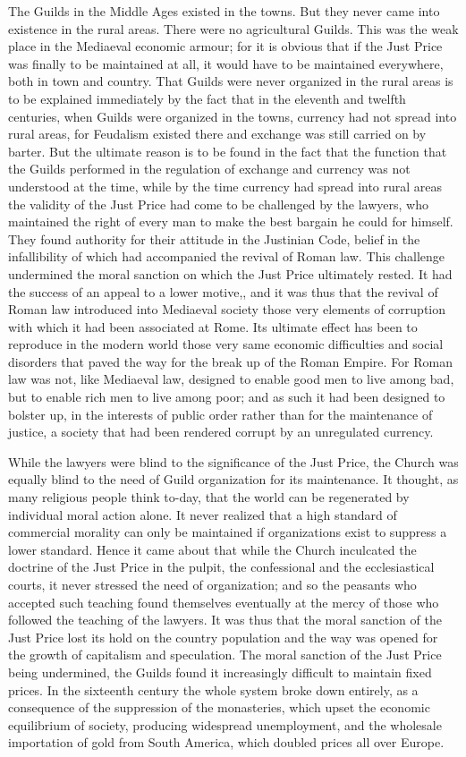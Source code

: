 \documentclass{book}
\begin{document}
The Guilds in the Middle Ages existed in the towns. But they never came into existence in the rural areas. There were no agricultural Guilds. This was the weak place in the Mediaeval economic armour; for it is obvious that if the Just Price was finally to be maintained at all, it would have to be maintained everywhere, both in town and country. That Guilds were never organized in the rural areas is to be explained immediately by the fact that in the eleventh and twelfth centuries, when Guilds were organized in the towns, currency had not spread into rural areas, for Feudalism existed there and exchange was still carried on by barter. But the ultimate reason is to be found in the fact that the function that the Guilds performed in the regulation of exchange and currency was not understood at the time, while by the time currency had spread into rural areas the validity of the Just Price had come to be challenged by the lawyers, who maintained the right of every man to make the best bargain he could for himself. They found authority for their attitude in the Justinian Code, belief in the infallibility of which had accompanied the revival of Roman law. This challenge undermined the moral sanction on which the Just Price ultimately rested. It had the success of an appeal to a lower motive,, and it was thus that the revival of Roman law introduced into Mediaeval society those very elements of corruption with which it had been associated at Rome. Its ultimate effect has been to reproduce in the modern world those very same economic difficulties and social disorders that paved the way for the break up of the Roman Empire. For Roman law was not, like Mediaeval law, designed to enable good men to live among bad, but to enable rich men to live among poor; and as such it had been designed to bolster up, in the interests of public order rather than for the maintenance of justice, a society that had been rendered corrupt by an unregulated currency.

While the lawyers were blind to the significance of the Just Price, the Church was equally blind to the need of Guild organization for its maintenance. It thought, as many religious people think to-day, that the world can be regenerated by individual moral action alone. It never realized that a high standard of commercial morality can only be maintained if organizations exist to suppress a lower standard. Hence it came about that while the Church inculcated the doctrine of the Just Price in the pulpit, the confessional and the ecclesiastical courts, it never stressed the need of organization; and so the peasants who accepted such teaching found themselves eventually at the mercy of those who followed the teaching of the lawyers. It was thus that the moral sanction of the Just Price lost its hold on the country population and the way was opened for the growth of capitalism and speculation. The moral sanction of the Just Price being undermined, the Guilds found it increasingly difficult to maintain fixed prices. In the sixteenth century the whole system broke down entirely, as a consequence of the suppression of the monasteries, which upset the economic equilibrium of society, producing widespread unemployment, and the wholesale importation of gold from South America, which doubled prices all over Europe.
\end{document}
